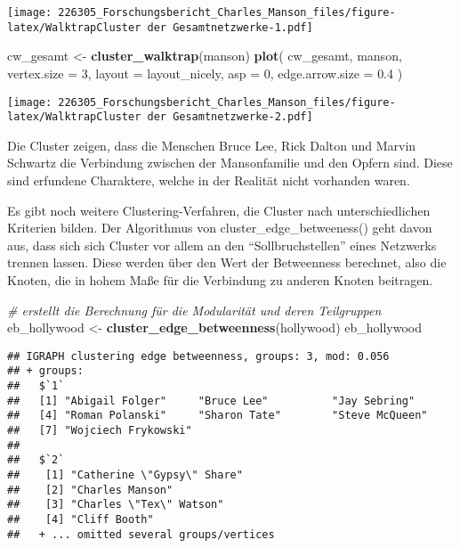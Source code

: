 \documentclass[
]{article}
\newenvironment{Shaded}{\begin{snugshade}}{\end{snugshade}}
\newcommand{\CommentTok}[1]{\textcolor[rgb]{0.56,0.35,0.01}{\textit{#1}}}
\newcommand{\DataTypeTok}[1]{\textcolor[rgb]{0.13,0.29,0.53}{#1}}
\newcommand{\DecValTok}[1]{\textcolor[rgb]{0.00,0.00,0.81}{#1}}
\newcommand{\FloatTok}[1]{\textcolor[rgb]{0.00,0.00,0.81}{#1}}
\newcommand{\KeywordTok}[1]{\textcolor[rgb]{0.13,0.29,0.53}{\textbf{#1}}}
\newcommand{\NormalTok}[1]{#1}
\newcommand{\StringTok}[1]{\textcolor[rgb]{0.31,0.60,0.02}{#1}}
\begin{document}
\texttt{[image: 226305\_Forschungsbericht\_Charles\_Manson\_files/figure-latex/WalktrapCluster der Gesamtnetzwerke-1.pdf]}

\begin{Shaded}
\begin{Highlighting}[]
\NormalTok{cw_gesamt <-}\StringTok{ }\KeywordTok{cluster_walktrap}\NormalTok{(manson)}
\KeywordTok{plot}\NormalTok{(}
\NormalTok{  cw_gesamt,}
\NormalTok{  manson,}
  \DataTypeTok{vertex.size =} \DecValTok{3}\NormalTok{,}
  \DataTypeTok{layout =}\NormalTok{ layout_nicely,}
  \DataTypeTok{asp =} \DecValTok{0}\NormalTok{,}
  \DataTypeTok{edge.arrow.size =} \FloatTok{0.4}
\NormalTok{)}
\end{Highlighting}
\end{Shaded}

\texttt{[image: 226305\_Forschungsbericht\_Charles\_Manson\_files/figure-latex/WalktrapCluster der Gesamtnetzwerke-2.pdf]}

Die Cluster zeigen, dass die Menschen Bruce Lee, Rick Dalton und Marvin
Schwartz die Verbindung zwischen der Mansonfamilie und den Opfern sind.
Diese sind erfundene Charaktere, welche in der Realität nicht vorhanden
waren.

Es gibt noch weitere Clustering-Verfahren, die Cluster nach
unterschiedlichen Kriterien bilden. Der Algorithmus von
cluster\_edge\_betweeness() geht davon aus, dass sich sich Cluster vor
allem an den ``Sollbruchstellen'' eines Netzwerks trennen lassen. Diese
werden über den Wert der Betweenness berechnet, also die Knoten, die in
hohem Maße für die Verbindung zu anderen Knoten beitragen.

\begin{Shaded}
\begin{Highlighting}[]
\CommentTok{# erstellt die Berechnung für die Modularität und deren Teilgruppen}
\NormalTok{eb_hollywood <-}\StringTok{ }\KeywordTok{cluster_edge_betweenness}\NormalTok{(hollywood)}
\NormalTok{eb_hollywood}
\end{Highlighting}
\end{Shaded}

\begin{verbatim}
## IGRAPH clustering edge betweenness, groups: 3, mod: 0.056
## + groups:
##   $`1`
##   [1] "Abigail Folger"     "Bruce Lee"          "Jay Sebring"       
##   [4] "Roman Polanski"     "Sharon Tate"        "Steve McQueen"     
##   [7] "Wojciech Frykowski"
##   
##   $`2`
##    [1] "Catherine \"Gypsy\" Share"                       
##    [2] "Charles Manson"                                  
##    [3] "Charles \"Tex\" Watson"                          
##    [4] "Cliff Booth"                                     
##   + ... omitted several groups/vertices
\end{verbatim}
\end{document}
